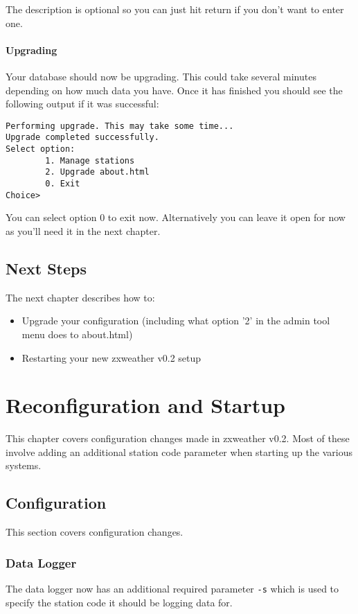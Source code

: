 \documentclass[a4paper,10pt,draft]{book}
\begin{document}
The description is optional so you can just hit return if you don't want to enter one.

\subsubsection{Upgrading}
Your database should now be upgrading. This could take several minutes depending on how much data you have. Once it has finished you should see the following output if it was successful:
\begin{verbatim}
Performing upgrade. This may take some time...
Upgrade completed successfully.
Select option:
        1. Manage stations
        2. Upgrade about.html
        0. Exit
Choice>
\end{verbatim}

You can select option 0 to exit now. Alternatively you can leave it open for now as you'll need it in the next chapter.

\section{Next Steps}
The next chapter describes how to:
\begin{itemize}
\item Upgrade your configuration (including what option '2' in the admin tool menu does to about.html)
\item Restarting your new zxweather v0.2 setup
\end{itemize}

\chapter{Reconfiguration and Startup}
This chapter covers configuration changes made in zxweather v0.2. Most of these involve adding an additional station code parameter when starting up the various systems.

\section{Configuration}
This section covers configuration changes.

\subsection{Data Logger}
The data logger now has an additional required parameter \verb|-s| which is used to specify the station code it should be logging data for.
\end{document}
